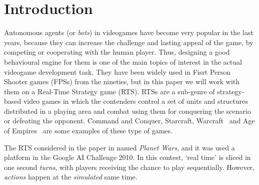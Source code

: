 \documentclass{llncs}
\begin{document}
%
%
\section{Introduction}
\label{sec:intro}
%







Autonomous agents (or \textit{bots}) in videogames have become very popular in the last years, because they can increase the challenge and lasting appeal of the game, by competing or cooperating with the human player.
Thus, designing a good behavioural engine for them is one of the main
topics of interest in the actual videogame development task.
They have been widely used in Fisrt Person Shooter games (FPSs) %
from the nineties, but in this paper we will %
work with them on a Real-Time Strategy game (RTS).
RTSs are a sub-genre of strategy-based video games in which the contenders control a set of units and structures distributed in a playing area and combat using them for conquering the scenario or defeating the opponent.
Command and Conquer\texttrademark,
Starcraft\texttrademark, Warcraft\texttrademark~ and Age of
Empires\texttrademark~ are some examples of these type of games.   

The RTS considered %
in the paper 
in named \textit{Planet Wars}, and it was used a platform in the Google AI Challenge 2010. %
In this contest, `real time' is sliced in one second \textit{turns}, with players receiving the chance to play sequentially. However, \textit{actions} happen at the \textit{simulated} same time. 
\end{document}
